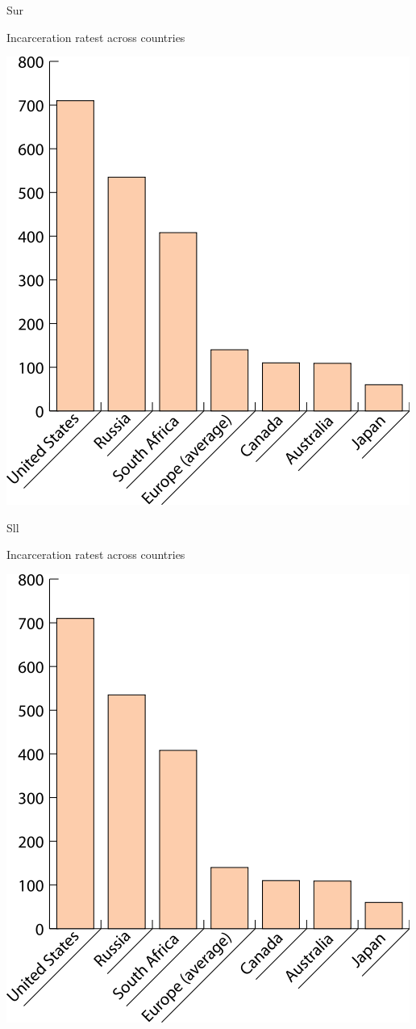 \begin{chart}{S}{ur}
\caption{Incarceration ratest across countries}
\label{chart:incarceration}
\includegraphics[width=\chartwidth,height=\chartheight]{incarceration}  
\end{chart}

\begin{chart}{S}{ll}
\caption{Incarceration ratest across countries}
\label{chart:incarceration}
\includegraphics[width=\chartwidth,height=\chartheight]{incarceration}  
\end{chart}

